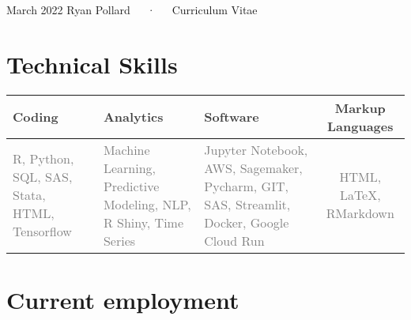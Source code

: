 \documentclass[11pt, a4paper]{awesome-cv}
\begin{document}
\makecvheader

\makecvfooter
  {March 2022}
    {Ryan Pollard~~~·~~~Curriculum Vitae}
  {\thepage}





\hypertarget{technical-skills}{%
\section{Technical Skills}\label{technical-skills}}

\begin{table}[!h]
\centering\begingroup\fontsize{9}{11}\selectfont

\begin{tabular}{>{\centering\arraybackslash}p{4.75cm}>{\centering\arraybackslash}p{4.75cm}>{\centering\arraybackslash}p{4.75cm}c}
\toprule
\textcolor[HTML]{414141}{\textbf{Coding}} & \textcolor[HTML]{414141}{\textbf{Analytics}} & \textcolor[HTML]{414141}{\textbf{Software}} & \textcolor[HTML]{414141}{\textbf{Markup Languages}}\\
\midrule
\textcolor[HTML]{7f7f7f}{R, Python, SQL, SAS, Stata, HTML, Tensorflow} & \textcolor[HTML]{7f7f7f}{Machine Learning, Predictive Modeling, NLP, R Shiny, Time Series} & \textcolor[HTML]{7f7f7f}{Jupyter Notebook, AWS, Sagemaker, Pycharm, GIT, SAS, Streamlit, Docker, Google Cloud Run} & \textcolor[HTML]{7f7f7f}{HTML, \LaTeX, RMarkdown}\\
\bottomrule
\end{tabular}
\endgroup{}
\end{table}

\hypertarget{current-employment}{%
\section{Current employment}\label{current-employment}}
\end{document}
